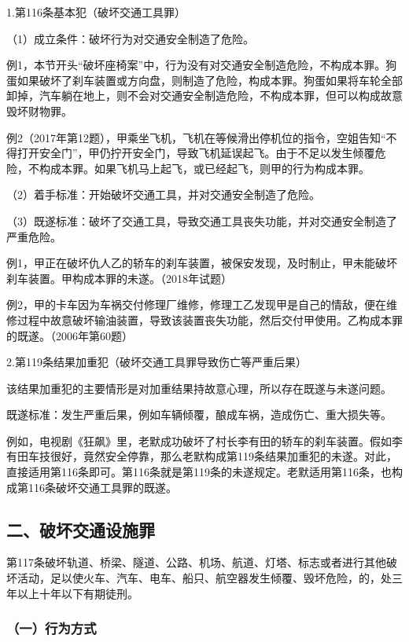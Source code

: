 1.第116条基本犯（破坏交通工具罪）

（1）成立条件：破坏行为对交通安全制造了危险。

例1，本节开头“破坏座椅案”中，行为没有对交通安全制造危险，不构成本罪。狗蛋如果破坏了刹车装置或方向盘，则制造了危险，构成本罪。狗蛋如果将车轮全部卸掉，汽车躺在地上，则不会对交通安全制造危险，不构成本罪，但可以构成故意毁坏财物罪。

例2（2017年第12题），甲乘坐飞机，飞机在等候滑出停机位的指令，空姐告知“不得打开安全门”，甲仍拧开安全门，导致飞机延误起飞。由于不足以发生倾覆危险，不构成本罪。如果飞机马上起飞，或已经起飞，则甲的行为构成本罪。

（2）着手标准：开始破坏交通工具，并对交通安全制造了危险。

（3）既遂标准：破坏了交通工具，导致交通工具丧失功能，并对交通安全制造了严重危险。

例1，甲正在破坏仇人乙的轿车的刹车装置，被保安发现，及时制止，甲未能破坏刹车装置。甲构成本罪的未遂。（2018年试题）

例2，甲的卡车因为车祸交付修理厂维修，修理工乙发现甲是自己的情敌，便在维修过程中故意破坏输油装置，导致该装置丧失功能，然后交付甲使用。乙构成本罪的既遂。（2006年第60题）

2.第119条结果加重犯（破坏交通工具罪导致伤亡等严重后果）

该结果加重犯的主要情形是对加重结果持故意心理，所以存在既遂与未遂问题。

既遂标准：发生严重后果，例如车辆倾覆，酿成车祸，造成伤亡、重大损失等。

例如，电视剧《狂飙》里，老默成功破坏了村长李有田的轿车的刹车装置。假如李有田车技很好，竟然安全停靠，那么老默构成第119条结果加重犯的未遂。对此，直接适用第116条即可。第116条就是第119条的未遂规定。老默适用第116条，也构成第116条破坏交通工具罪的既遂。

\subsection*{二、破坏交通设施罪}

第117条破坏轨道、桥梁、隧道、公路、机场、航道、灯塔、标志或者进行其他破坏活动，足以使火车、汽车、电车、船只、航空器发生倾覆、毁坏危险，的，处三年以上十年以下有期徒刑。

\subsubsection*{（一）行为方式}

